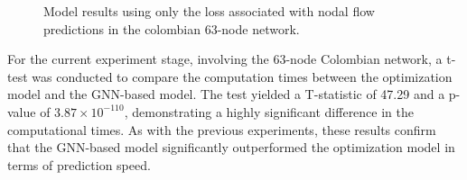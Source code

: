 \begin{figure}
    \centering
        \setlength{}        
        \setlength{} 
    \caption{Model results using only the loss associated with nodal flow predictions in the colombian 63-node network.}
    \label{fig:lineal_col_base_results}
\end{figure}

%
%
%
%
%

For the current experiment stage, involving the 63-node Colombian network, a t-test was conducted to compare the computation times between the optimization model and the GNN-based model. The test yielded a T-statistic of 47.29 and a p-value of $3.87 \times 10^{-110}$, demonstrating a highly significant difference in the computational times. As with the previous experiments, these results confirm that the GNN-based model significantly outperformed the optimization model in terms of prediction speed.




